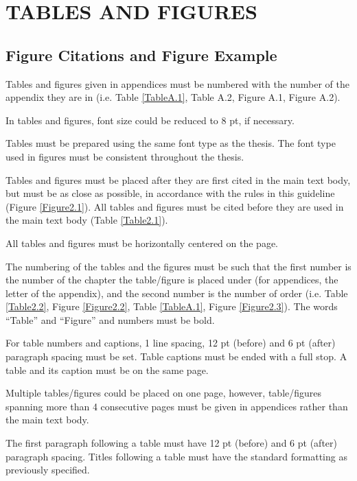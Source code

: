 \chapter{TABLES AND FIGURES }\label{Ch2}
\vspace*{-12pt} %
\section{Figure Citations and Figure Example}

Tables and figures given in appendices must be numbered with the number of the appendix they are in (i.e. Table \ref{TableA.1}, Table A.2, Figure A.1, Figure A.2).

In tables and figures, font size could be reduced to 8 pt, if necessary.

Tables must be prepared using the same font type as the thesis. The font type used in figures must be consistent throughout the thesis.

Tables and figures must be placed after they are first cited in the main text body, but must be as close as possible, in accordance with the rules in this guideline (Figure \ref{Figure2.1}). All tables and figures must be cited before they are used in the main text body (Table \ref{Table2.1}).

All tables and figures must be horizontally centered on the page.

The numbering of the tables and the figures must be such that the first number is the number of the chapter the table/figure is placed under (for appendices, the letter of the appendix), and the second number is the number of order (i.e. Table \ref{Table2.2}, Figure \ref{Figure2.2}, Table \ref{TableA.1}, Figure \ref{Figure2.3}). The words “Table” and “Figure” and numbers must be bold.

For table numbers and captions, 1 line spacing, 12 pt (before) and 6 pt (after) paragraph spacing must be set. Table captions must be ended with a full stop. A table and its caption must be on the same page. 

Multiple tables/figures could be placed on one page, however, table/figures spanning more than 4 consecutive pages must be given in appendices rather than the main text body.

The first paragraph following a table must have 12 pt (before) and 6 pt (after) paragraph spacing. Titles following a table must have the standard formatting as previously specified. 

